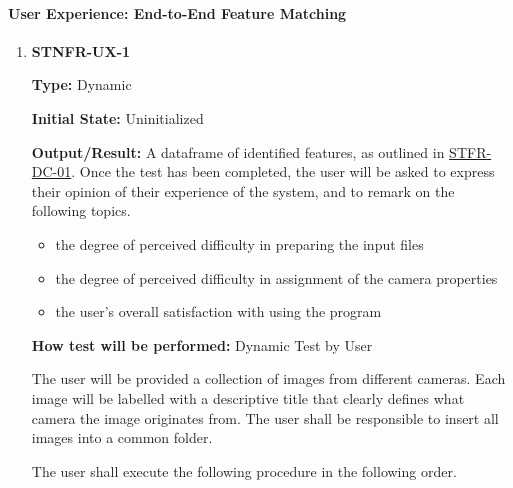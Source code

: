 \documentclass[12pt, titlepage]{article}
\begin{document}
\paragraph{User Experience: End-to-End Feature Matching}
\begin{enumerate}
\item \hypertarget{STNFR-UX-1}{\textbf{STNFR-UX-1}\\}
\textbf{Type:} Dynamic

\textbf{Initial State:} Uninitialized

\textbf{Output/Result:} A dataframe of identified features, as outlined in \hyperlink{STFR-DC-01}{STFR-DC-01}. 
Once the test has been completed, the user will be asked to express their opinion of their experience of the 
system, and to remark on the following topics.
\begin{itemize}
\item the degree of perceived difficulty in preparing the input files
\item the degree of perceived difficulty in assignment of the camera properties
\item the user's overall satisfaction with using the program
\end{itemize} 

\textbf{How test will be performed:} Dynamic Test by User

The user will be provided a collection of images from different cameras. Each image will be labelled with 
a descriptive title that clearly defines what camera the image originates from. The user shall be responsible 
to insert all images into a common folder.

The user shall execute the following procedure in the following order.


\end{enumerate}
\end{document}

